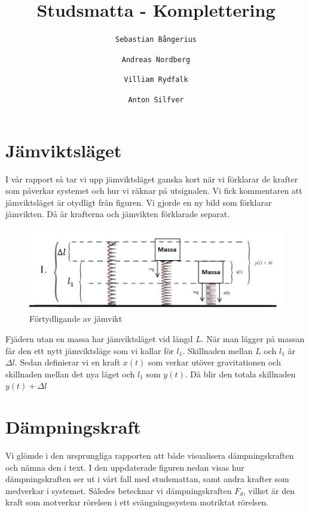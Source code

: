 \documentclass[10pt,a4paper]{article}
\author{
  \texttt{Sebastian Bångerius}
  \and
  \texttt{Andreas Nordberg}
  \and
  \texttt{Villiam Rydfalk}
  \and
  \texttt{Anton Silfver}
}
\begin{document}

\title{Studsmatta - Komplettering}
\maketitle

\cleardoublepage




\section{Jämviktsläget}

I vår rapport så tar vi upp jämviktsläget ganska kort när vi förklarar de krafter som påverkar systemet och hur vi räknar på utsignalen. Vi fick kommentaren att jämviktsläget är otydligt från figuren. Vi gjorde en ny bild som förklarar jämvikten. Då är krafterna och jämvikten förklarade separat.

\begin{figure}[h]
\begin{center}
\includegraphics[scale=0.6]{jamvikt}
\caption{Förtydligande av jämvikt}
\end{center}
\end{figure}

Fjädern utan en massa har jämviktsläget vid längd $L$. När man lägger på massan får den ett nytt jämviktsläge som vi kallar för $l_1$. Skillnaden mellan $L$ och $l_1$ är $\Delta l$. Sedan definierar vi en kraft $x(t)$ som verkar utöver gravitationen och skillnaden mellan det nya läget och $l_1$ som $y(t)$. Då blir den totala skillnaden $y(t) + \Delta l$

\section{Dämpningskraft}

Vi glömde i den ursprungliga rapporten att både visualisera dämpningskraften och nämna den i text. I den uppdaterade figuren nedan visas hur dämpningskraften ser ut i vårt fall med studsmattan, samt andra krafter som medverkar i systemet. Således betecknar vi dämpningskraften $F_d$, vilket är den kraft som motverkar rörelsen i ett svängningssystem motriktat rörelsen.
\end{document}
